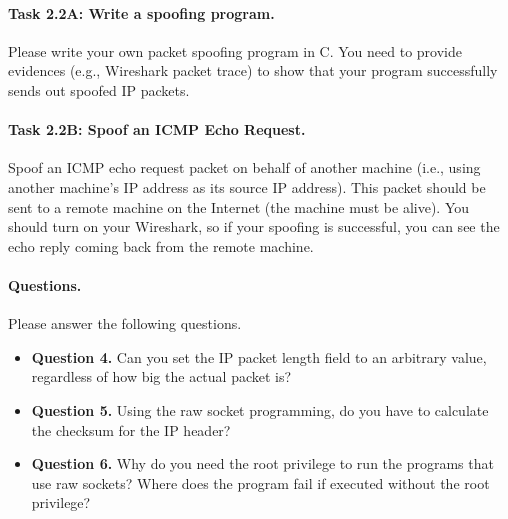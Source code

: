 \paragraph{Task 2.2A: Write a spoofing program.}
Please write your own packet spoofing program in C. You need 
to provide evidences (e.g., Wireshark packet trace) to show that your 
program successfully sends out spoofed IP packets.


\paragraph{Task 2.2B: Spoof an ICMP Echo Request.}
Spoof an ICMP echo request packet on behalf of another machine (i.e., 
using another machine's IP address as its source IP address). This packet 
should be sent to a remote machine on the Internet (the machine must be
alive). You should turn on your Wireshark, so if your spoofing is successful, 
you can see the echo reply coming back from the remote machine. 


%
%


\paragraph{Questions.} Please answer the following questions.

\begin{itemize}
\item \textbf{Question 4.}
Can you set the IP packet length field to an arbitrary value,
regardless of how big the actual packet is? 


\item \textbf{Question 5.} 
Using the raw socket programming, do you have to calculate the 
checksum for the IP header? 

\item \textbf{Question 6.} 
Why do you need the root privilege to run the programs that 
use raw sockets? Where does the program fail if executed without the root 
privilege?

\end{itemize}
 




